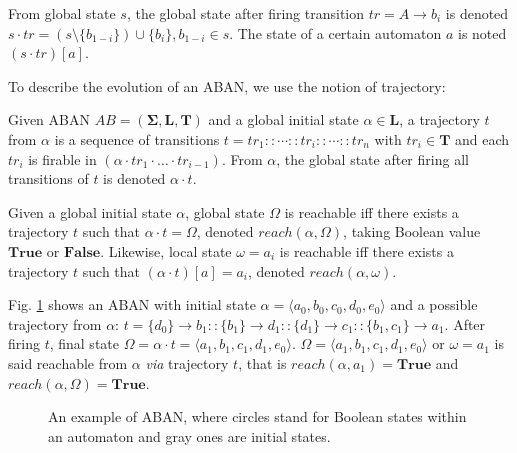 \documentclass[runningheads]{llncs}
\newcommand{\acm}[3]{\{#1\}\rightarrow#3}
\begin{document}
\begin{definition}[Dynamics]
    From global state $s$, the global state after firing transition $tr=A\to b_i$ is denoted $s \cdot tr = (s \setminus \{b_{1-i}\}) \cup \{b_{i}\}, b_{1-i} \in s$.
    The state of a certain automaton $a$ is noted $(s\cdot tr)[a]$.
\end{definition}
To describe the evolution of an ABAN, we use the notion of trajectory:
\begin{definition}[Trajectory]
Given ABAN $AB = (\mathbf{\Sigma},\mathbf{L},\mathbf{T})$ and a global initial state $\alpha\in \mathbf{L}$, a trajectory $t$ from $\alpha$ is a sequence of transitions $t=tr_1::\cdots :: tr_i::\cdots ::tr_n$ with $tr_i\in\mathbf{T}$ and each $tr_i$ is firable in $(\alpha \cdot tr_1 \cdot \ldots \cdot tr_{i-1})$.
From $\alpha$, the global state after firing all transitions of $t$ is denoted $\alpha \cdot t$.
\end{definition}

\begin{definition}[Reachability]
Given a global initial state $\alpha$, global state $\Omega$ is reachable iff there exists a trajectory $t$ such that $\alpha\cdot t=\Omega$, denoted $reach(\alpha, \Omega)$, taking Boolean value $\mathbf{True}$ or $\mathbf{False}$.
Likewise, local state $\omega=a_i$ is reachable iff there exists a trajectory $t$ such that $(\alpha\cdot t)[a]=a_i$, denoted $reach(\alpha, \omega)$.
\end{definition}
\begin{example}\label{example:aban}
Fig. \ref{fig:1} shows an ABAN with initial state $\alpha=\langle a_0,b_0,c_0,d_0,e_0\rangle$ and a possible trajectory from $\alpha$: $t=\acm{d_0}{b_0}{b_1}::\acm{b_1}{d_0}{d_1}::\acm{d_1}{c_0}{c_1}::\acm{b_1,c_1}{a_0}{a_1}$. After firing $t$, final state $\Omega=\alpha\cdot t=\langle a_1,b_1,c_1,d_1,e_0\rangle$.
$\Omega=\langle a_1,b_1,c_1,d_1,e_0\rangle$ or $\omega=a_1$ is said reachable from $\alpha$ \textit{via} trajectory $t$, that is $reach(\alpha,a_1)=\mathbf{True}$ and $reach(\alpha,\Omega)=\mathbf{True}$.
\end{example}
\begin{figure}[ht]
\centering

\caption{An example of ABAN, where circles stand for Boolean states within an automaton and gray ones are initial states.}\label{fig:1}
\end{figure}	
\end{document}
